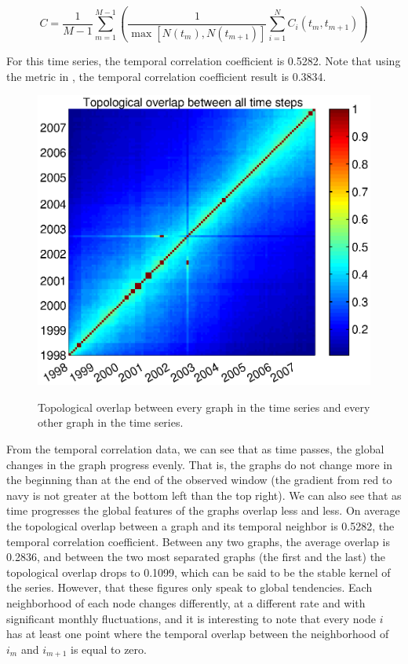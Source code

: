\documentclass[12pt]{article}
\begin{document}
\begin{equation}
C = \frac{1}{M-1}\sum_{m=1}^{M-1}  \left( \frac{1}{\max [N(t_m),N(t_{m+1})]} \sum_{i = 1}^{N} C_i(t_m,t_{m+1}) \right)
\label{eq:C2}
\end{equation}

For this time series, the temporal correlation coefficient is 0.5282. Note that using the metric in \cite{3}, the temporal correlation coefficient result is 0.3834.



\begin{figure}[H]
\includegraphics[trim = 0cm 0cm 0cm 0cm, width = .9\textwidth]{Graficos/overlap.eps}
\label{fig:overlap}
\caption{Topological overlap between every graph in the time series and every other graph in the time series.}
\end{figure}

From the temporal correlation data, we can see that as time passes, the global changes in the graph progress evenly. That is, the graphs do not change more in the beginning than at the end of the observed window (the gradient from red to navy is not greater at the bottom left than the top right). We can also see that as time progresses the global features of the graphs overlap less and less. On average the topological overlap between a graph and its temporal neighbor is 0.5282, the temporal correlation coefficient. Between any two graphs, the average overlap is 0.2836, and between the two most separated graphs (the first and the last) the topological overlap drops to 0.1099, which can be said to be the stable kernel of the series. \newline However, that these figures only speak to global tendencies. Each neighborhood of each node changes differently, at a different rate and with significant monthly fluctuations, and it is interesting to note that every node \(i\) has at least one point where the temporal overlap between the neighborhood of \(i_m\) and \(i_{m+1}\) is equal to zero.
\end{document}
